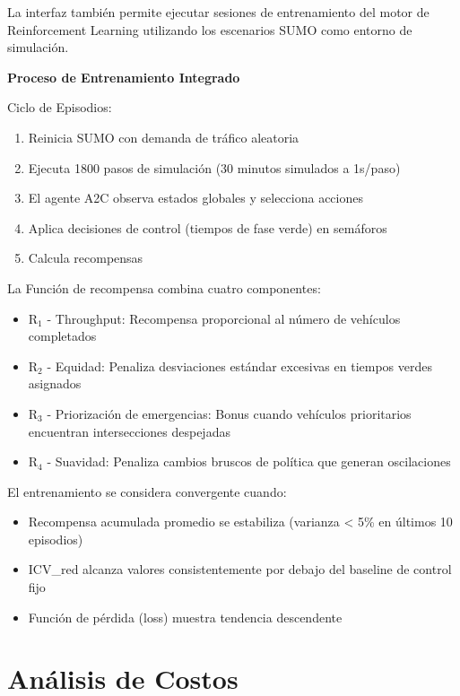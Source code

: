 \documentclass[12pt,a4paper,oneside]{report}
\begin{document}
La interfaz también permite ejecutar sesiones de entrenamiento del motor de Reinforcement Learning utilizando los escenarios SUMO como entorno de simulación.

\textbf{Proceso de Entrenamiento Integrado}

Ciclo de Episodios:

\begin{enumerate}
\def\labelenumi{\arabic{enumi}.}
\item
  Reinicia SUMO con demanda de tráfico aleatoria
\item
  Ejecuta 1800 pasos de simulación (30 minutos simulados a 1s/paso)
\item
  El agente A2C observa estados globales y selecciona acciones
\item
  Aplica decisiones de control (tiempos de fase verde) en semáforos
\item
  Calcula recompensas
\end{enumerate}

La Función de recompensa combina cuatro componentes:

\begin{itemize}
\item
  R\ensuremath{_{1}} - Throughput: Recompensa proporcional al número de vehículos completados
\item
  R\ensuremath{_{2}} - Equidad: Penaliza desviaciones estándar excesivas en tiempos verdes asignados
\item
  R\ensuremath{_{3}} - Priorización de emergencias: Bonus cuando vehículos prioritarios encuentran intersecciones despejadas
\item
  R\ensuremath{_{4}} - Suavidad: Penaliza cambios bruscos de política que generan oscilaciones
\end{itemize}

El entrenamiento se considera convergente cuando:

\begin{itemize}
\item
  Recompensa acumulada promedio se estabiliza (varianza \textless{} 5\% en últimos 10 episodios)
\item
  ICV\_red alcanza valores consistentemente por debajo del baseline de control fijo
\item
  Función de pérdida (loss) muestra tendencia descendente
\end{itemize}

\section{Análisis de Costos}\label{anuxe1lisis-de-costos}
\end{document}
